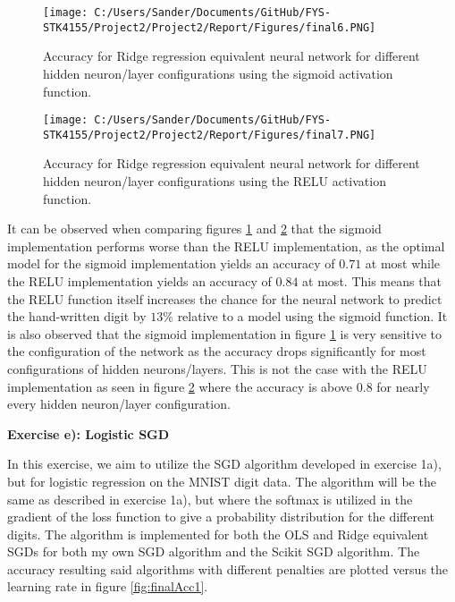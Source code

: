 \documentclass[12pt,a4paper]{article}
\begin{document}
\begin{figure}[H]
\centering
\texttt{[image: C:/Users/Sander/Documents/GitHub/FYS-STK4155/Project2/Project2/Report/Figures/final6.PNG]}
\caption{\label{fig:AccvsLrate6} Accuracy for Ridge regression equivalent neural network for different hidden neuron/layer configurations using the sigmoid activation function.}
\end{figure}

\begin{figure}[H]
\centering
\texttt{[image: C:/Users/Sander/Documents/GitHub/FYS-STK4155/Project2/Project2/Report/Figures/final7.PNG]}
\caption{\label{fig:AccvsLrate7} Accuracy for Ridge regression equivalent neural network for different hidden neuron/layer configurations using the RELU activation function.}
\end{figure}

\noindent It can be observed when comparing figures \ref{fig:AccvsLrate6} and \ref{fig:AccvsLrate7} that the sigmoid implementation performs worse than the RELU implementation, as the optimal model for the sigmoid implementation yields an accuracy of $0.71$ at most while the RELU implementation yields an accuracy of $0.84$ at most. This means that the RELU function itself increases the chance for the neural network to predict the hand-written digit by $13\%$ relative to a model using the sigmoid function. It is also observed that the sigmoid implementation in figure \ref{fig:AccvsLrate6} is very sensitive to the configuration of the network as the accuracy drops significantly for most configurations of hidden neurons/layers. This is not the case with the RELU implementation as seen in figure \ref{fig:AccvsLrate7} where the accuracy is above $0.8$ for nearly every hidden neuron/layer configuration. 

\newpage

\begin{center}
\Large{\textbf{Exercise e): Logistic SGD}}
\end{center}

\noindent In this exercise, we aim to utilize the SGD algorithm developed in exercise 1a), but for logistic regression on the MNIST digit data. The algorithm will be the same as described in exercise 1a), but where the softmax is utilized in the gradient of the loss function to give a probability distribution for the different digits. The algorithm is implemented for both the OLS and Ridge equivalent SGDs for both my own SGD algorithm and the Scikit SGD algorithm. The accuracy resulting said algorithms with different penalties are plotted versus the learning rate in figure \ref{fig:finalAcc1}.
\end{document}
